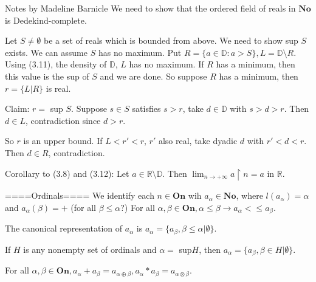 Notes by Madeline Barnicle
We need to show that the ordered field of reals in $\mathbf{No}$ is Dedekind-complete.

Let $S \neq \emptyset$ be a set of reals which is bounded from above. We need to show sup $S$ exists. We can assume $S$ has no maximum. Put $R=\{a \in \mathbb{D}: a>S\}, L=\mathbb{D} \setminus R$. Using (3.11), the density of $\mathbb{D}$, $L$ has no maximum. If $R$ has a minimum, then this value is the sup of $S$ and we are done. So suppose $R$ has a minimum, then $r=\{L|R\}$ is real.

Claim: $r=$ sup $S$. Suppose $s \in S$ satisfies $s>r$, take $d \in \mathbb{D}$ with $s>d>r$. Then $d \in L$, contradiction since $d>r$.

So $r$ is an upper bound. If $L<r'<r$, $r'$ also real, take dyadic $d$ with $r'<d<r$. Then $d \in R$, contradiction.

\begin{corollary} %
Corollary to (3.8) and (3.12): Let $a \in \mathbb{R} \setminus \mathbb{D}$. Then $\lim_{n \to +\infty} a \restriction n =a$ in $\mathbb{R}$.
 \end{corollary}

====Ordinals====
We identify each $n \in \mathbf{On}$ wih $a_\alpha \in \mathbf{No}$, where $l(a_\alpha)=\alpha$ and $a_{\alpha}(\beta)=+$ (for all $\beta \leq \alpha$?) For all $\alpha, \beta \in \mathbf{On}, \alpha \leq \beta \rightarrow a_\alpha <\leq a_\beta$.

The canonical representation of $a_\alpha$ is $a_\alpha = \{a_{\beta}, \beta \leq \alpha | \emptyset \}$.

If $H$ is any nonempty set of ordinals and $\alpha =$ sup$ H$, then $a_\alpha = \{a_{\beta}, \beta \in H | \emptyset \}$.

\begin{proposition} %
For all $\alpha, \beta \in \mathbf{On}, a_\alpha + a_\beta = a_{\alpha \oplus \beta}, a_\alpha * a_\beta = a_{\alpha \otimes \beta}$.
 \end{proposition}


